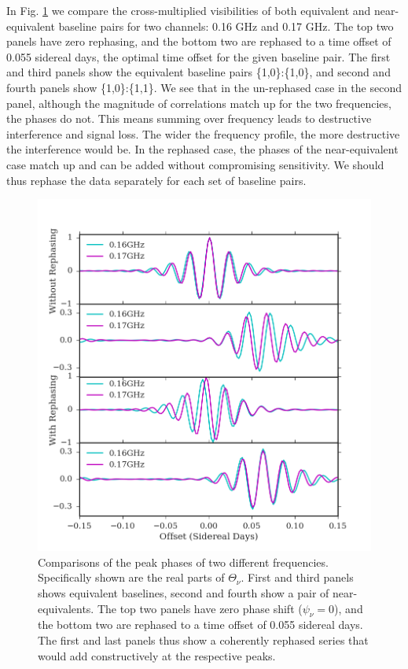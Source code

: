 \documentclass[twocolumn,apj,numberedappendix]{emulateapj}
\renewcommand\[{\begin{equation}}
\renewcommand\]{\end{equation}}
\begin{document}
In Fig. \ref{fig:freqdiff} we compare the cross-multiplied visibilities of both equivalent and near-equivalent baseline pairs for two channels: 0.16 GHz and 0.17 GHz. The top two panels have zero rephasing, and the bottom two are rephased to a time offset of 0.055 sidereal days, the optimal time offset for the given baseline pair. The first and third panels show the equivalent baseline pairs \{1,0\}:\{1,0\}, and second and fourth panels show \{1,0\}:\{1,1\}. We see that in the un-rephased case in the second panel, although the magnitude of correlations match up for the two frequencies, the phases do not. This means summing over frequency leads to destructive interference and signal loss. The wider the frequency profile, the more destructive the interference would be. In the rephased case, the phases of the near-equivalent case match up and can be added without compromising sensitivity. We should thus rephase the data separately for each set of baseline pairs. 

\begin{figure}[H]
\includegraphics[width=1.1\linewidth]{rephs}

\caption{Comparisons of the peak phases of two different frequencies. Specifically shown are the real parts of $\Theta_{\nu}$. First and third panels shows equivalent baselines, second and fourth show a pair of near-equivalents. The top two panels have zero phase shift ($\psi_{\nu}=0$), and the bottom two are rephased to a time offset of 0.055 sidereal days. The first and last panels thus show a coherently rephased series that would add constructively at the respective peaks. }
\label{fig:freqdiff}
\end{figure}
\end{document}
